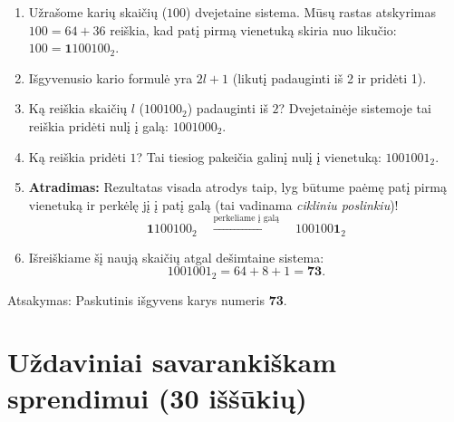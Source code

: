 \documentclass[11pt,a4paper]{scrartcl}
\newenvironment{solution}
    {\begin{list}{}{\setlength{\leftmargin}{10pt}\setlength{\rightmargin}{10pt}}\item[]}
    {\end{list}}
\begin{document}
\begin{solution}
\begin{enumerate}
    \item Užrašome karių skaičių ($100$) dvejetaine sistema. Mūsų rastas atskyrimas $100 = 64 + 36$ reiškia, kad patį pirmą vienetuką skiria nuo likučio: $100 = \mathbf{1}100100_2$.
    \item Išgyvenusio kario formulė yra $2l + 1$ (likutį padauginti iš 2 ir pridėti 1).
    \item Ką reiškia skaičių $l$ ($100100_2$) padauginti iš $2$? Dvejetainėje sistemoje tai reiškia pridėti nulį į galą: $1001000_2$. 
    \item Ką reiškia pridėti $1$? Tai tiesiog pakeičia galinį nulį į vienetuką: $1001001_2$.
    \item \textbf{Atradimas:} Rezultatas visada atrodys taip, lyg būtume paėmę patį pirmą vienetuką ir perkėlę jį į patį galą (tai vadinama \textit{cikliniu poslinkiu})!
    \[ \mathbf{1}100100_2 \quad \xrightarrow{\text{perkeliame į galą}} \quad 100100\mathbf{1}_2 \]
    \item Išreiškiame šį naują skaičių atgal dešimtaine sistema:
    \[ 1001001_2 = 64 + 8 + 1 = \mathbf{73}. \]
\end{enumerate}

Atsakymas: Paskutinis išgyvens karys numeris \textbf{73}. 
\end{solution}

\newpage
\section{Uždaviniai savarankiškam sprendimui (30 iššūkių)}
\end{document}
